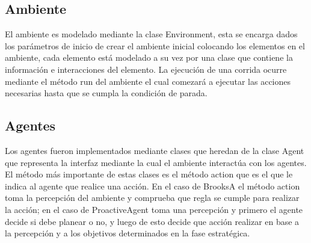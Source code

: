 \documentclass[12pt]{article}
\begin{document}
\subsection{Ambiente}
El ambiente es modelado mediante la clase Environment, esta se encarga dados los par\'ametros de inicio de crear el ambiente 
inicial colocando los elementos en el ambiente, cada elemento est\'a modelado a su vez por una clase que contiene la informaci\'on e interacciones
del elemento. La ejecuci\'on de una corrida ocurre mediante el m\'etodo run del ambiente el cual comezar\'a a ejecutar las acciones necesarias hasta que se cumpla
la condici\'on de parada.
\subsection{Agentes}
Los agentes fueron implementados mediante clases que heredan de la clase Agent que representa la interfaz mediante la cual el ambiente interact\'ua con los
agentes. El m\'etodo m\'as importante de estas clases es el m\'etodo action que es el que le indica al agente que realice una acci\'on. En el caso de BrooksA el m\'etodo action toma 
la percepci\'on del ambiente y comprueba que regla se cumple para realizar la acci\'on; en el caso de ProactiveAgent toma una percepci\'on y primero el agente decide si debe planear o no, y luego de esto decide
que acci\'on realizar en base a la percepci\'on y a los objetivos determinados en la fase estrat\'egica.
\end{document}
